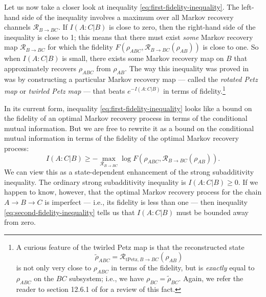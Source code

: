 \documentclass[a4paper,11pt]{article}
\renewcommand{\tilde}{\widetilde}
\begin{document}
Let us now take a closer look at inequality \eqref{eq:first-fidelity-inequality}. The left-hand side of the inequality involves a maximum over all Markov recovery channels $\mathcal{R}_{B \rightarrow BC}$. If $I(A:C|B)$ is close to zero, then the right-hand side of the inequality is close to 1; this means that there must exist \emph{some} Markov recovery map $\mathcal{R}_{B \rightarrow BC}$ for which the fidelity $F(\rho_{ABC}, \mathcal{R}_{B\rightarrow BC}(\rho_{AB}))$ is close to one. So when $I(A:C|B)$ is small, there exists some Markov recovery map on $B$ that approximately recovers $\rho_{ABC}$ from $\rho_{AB}$. The way this inequality was proved in \cite{fawzi2015quantum,junge2018universal} was by constructing a particular Markov recovery map --- called the \emph{rotated Petz map} or \emph{twirled Petz map} --- that beats $e^{- I(A:C|B)}$ in terms of fidelity.\footnote{A curious feature of the twirled Petz map is that the reconstructed state
\begin{equation*}
    \tilde{\rho}_{ABC} = \mathcal{R}_{\text{tPetz}, B \rightarrow BC}(\rho_{AB})
\end{equation*}
is not only very close to $\rho_{ABC}$ in terms of the fidelity, but is \emph{exactly} equal to $\rho_{ABC}$ on the $BC$ subsystem; i.e., we have $\rho_{BC} = \tilde{\rho}_{BC}.$ Again, we refer the reader to section 12.6.1 of \cite{WildeBook} for a review of this fact.}

In its current form, inequality \eqref{eq:first-fidelity-inequality} looks like a bound on the fidelity of an optimal Markov recovery process in terms of the conditional mutual information. But we are free to rewrite it as a bound on the conditional mutual information in terms of the fidelity of the optimal Markov recovery process:
\begin{equation} \label{eq:second-fidelity-inequality}
    I(A:C|B) \geq - \max_{\mathcal{R}_{B \rightarrow BC}} \log F(\rho_{ABC}, \mathcal{R}_{B \rightarrow B C}(\rho_{AB})).
\end{equation}
We can view this as a state-dependent enhancement of the strong subadditivity inequality. The ordinary strong subadditivity inequality is $I(A:C|B) \geq 0$. If we happen to know, however, that the optimal Markov recovery process for the chain $A \rightarrow B \rightarrow C$ is imperfect --- i.e., its fidelity is less than one --- then inequality \eqref{eq:second-fidelity-inequality} tells us that $I(A:C|B)$ must be bounded away from zero.
\end{document}
